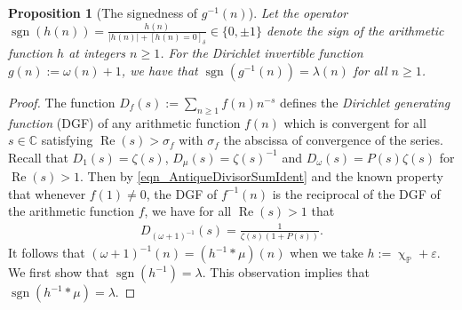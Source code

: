 \documentclass[11pt,reqno,a4letter]{article}
\numberwithin{figure}{section}
\numberwithin{table}{section}
\newcommand{\Iverson}[1]{\ensuremath{\left[#1\right]_{\delta}}}
\renewcommand{\chi}{\upchi}
\theoremstyle{plain}
\newtheorem{prop}[theorem]{Proposition}
\numberwithin{theorem}{section}
\theoremstyle{definition}
\renewcommand{\Re}{\operatorname{Re}}
\begin{document}
\begin{prop}[The signedness of $g^{-1}(n)$]
\label{prop_SignageDirInvsOfPosBddArithmeticFuncs_v1} 
Let the operator 
$\operatorname{sgn}(h(n)) = \frac{h(n)}{|h(n)| + \Iverson{h(n) = 0}} \in \{0, \pm 1\}$ denote the sign 
of the arithmetic function $h$ at integers $n \geq 1$. 
For the Dirichlet invertible function $g(n) := \omega(n) + 1$, 
we have that $\operatorname{sgn}(g^{-1}(n)) = \lambda(n)$ for all $n \geq 1$. 
\end{prop} 
\begin{proof} 
The function $D_f(s) := \sum_{n \geq 1} f(n) n^{-s}$ defines the 
\emph{Dirichlet generating function} (DGF) of any 
arithmetic function $f(n)$ which is convergent for all $s \in \mathbb{C}$ satisfying 
$\Re(s) > \sigma_f$ with $\sigma_f$ the abscissa of convergence of the series. 
Recall that $D_1(s) = \zeta(s)$, $D_{\mu}(s) = \zeta(s)^{-1}$ and $D_{\omega}(s) = P(s) \zeta(s)$ for 
$\Re(s) > 1$. 
Then by \eqref{eqn_AntiqueDivisorSumIdent} and the known property that whenever $f(1) \neq 0$, 
the DGF of $f^{-1}(n)$ is 
the reciprocal of the DGF of the arithmetic function $f$, 
we have for all $\Re(s) > 1$ that 
\begin{align} 
\label{eqn_DGF_of_gInvn} 
D_{(\omega+1)^{-1}}(s) = \frac{1}{\zeta(s) (1+P(s))}. 
\end{align} 
It follows that $(\omega + 1)^{-1}(n) = (h^{-1} \ast \mu)(n)$ when we take 
$h := \chi_{\mathbb{P}} + \varepsilon$. 
We first show that $\operatorname{sgn}(h^{-1}) = \lambda$. 
This observation implies 
that $\operatorname{sgn}(h^{-1} \ast \mu) = \lambda$. 


\end{proof}
\end{document}
